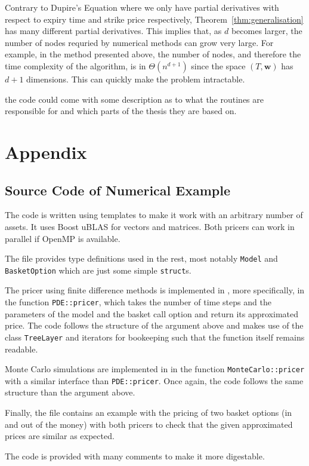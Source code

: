 \documentclass[english]{article}
\newcommand{\comment}[1]{\color{blue}#1\color{black}}
\numberwithin{equation}{section}
\numberwithin{figure}{section}
\theoremstyle{bolddescit}
\theoremstyle{definition}
\theoremstyle{definition}
\theoremstyle{plain}
\theoremstyle{plain}
\theoremstyle{bolddesc}
\theoremstyle{plain}
\theoremstyle{remark}
\begin{document}
Contrary to Dupire's Equation where we only have partial derivatives with respect to expiry time and strike price respectively, Theorem~\ref{thm:generalisation} has many different partial derivatives. This implies that, as $d$ becomes larger, the number of nodes requried by numerical methods can grow very large. For example, in the method presented above, the number of nodes, and therefore the time complexity of the algorithm, is in $\Theta(n^{d+1})$ since the space $(T,\mathbf{w})$ has $d+1$ dimensions. This can quickly make the problem intractable.

\comment{the code could come with some description as to what the routines are responsible for and which parts of the thesis they are based on.}

\pagebreak
\appendix
\section{Appendix}

\subsection{Source Code of Numerical Example}

The code is written using templates to make it work with an arbitrary number of assets. It uses Boost uBLAS for vectors and matrices. Both pricers can work in parallel if OpenMP is available.

The file  provides type definitions used in the rest, most notably \texttt{Model} and \texttt{BasketOption} which are just some simple \texttt{struct}s.

The pricer using finite difference methods is implemented in , more specifically, in the function \texttt{PDE::pricer}, which takes the number of time steps and the parameters of the model and the basket call option and return its approximated price. The code follows the structure of the argument above and makes use of the class \texttt{TreeLayer} and iterators for bookeeping such that the function itself remains readable.

Monte Carlo simulations are implemented in  in the function \texttt{MonteCarlo::pricer} with a similar interface than \texttt{PDE::pricer}. Once again, the code follows the same structure than the argument above.

Finally, the file  contains an example with the pricing of two basket options (in and out of the money) with both pricers to check that the given approximated prices are similar as expected.

The code is provided with many comments to make it more digestable.


\needspace{5cm}

\needspace{5cm}

\needspace{5cm}


\pagebreak
\printbibliography
\end{document}
